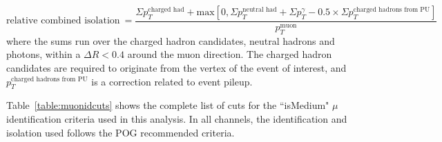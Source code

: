 \begin{equation}
\text{relative combined isolation}~= \frac{\Sigma p_T^{\text{charged had}} + \text{max}[0, \Sigma p_T^{\text{neutral had}} + 
\Sigma p_T^{\gamma} - 0.5\times\Sigma p_T^{\text{charged hadrons from PU}}]}{p_T^{\text{muon}}}
\label{eq:muIso}
\end{equation}
where the sums run over the charged hadron candidates, neutral hadrons and photons, within a $\Delta R < 0.4$ around 
the muon direction. The charged hadron candidates are required to originate from the vertex of the event of 
interest, and $p_T^{\text{charged hadrons from PU}}$ is a correction related to event pileup.

Table~\ref{table:muonidcuts} shows the complete list of cuts for the ``isMedium" $\mu$ identification criteria used in this analysis.
In all channels, the identification and isolation used follows the POG recommended criteria. 

\begin{table}[ht]
  \caption{$\mu$ Identification}
  \label{table:muonidcuts} %
\end{table}
